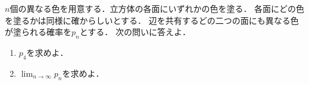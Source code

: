 \documentclass[../../main.tex]{subfiles}
\begin{document}
$n$個の異なる色を用意する．立方体の各面にいずれかの色を塗る．
各面にどの色を塗るかは同様に確からしいとする．
辺を共有するどの二つの面にも異なる色が塗られる確率を$p_n$とする．
次の問いに答えよ．
\begin{enumerate}
  \item$p_4$を求めよ．
  \item$\displaystyle\lim_{n\to\infty}p_n$を求めよ．
\end{enumerate}
\end{document}
